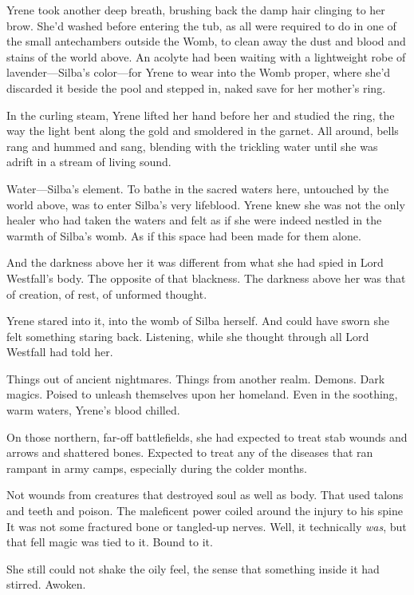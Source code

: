 Yrene took another deep breath, brushing back the damp hair clinging to her brow. She'd washed before entering the tub, as all were required to do in one of the small antechambers outside the Womb, to clean away the dust and blood and stains of the world above. An acolyte had been waiting with a lightweight robe of lavender---Silba's color---for Yrene to wear into the Womb proper, where she'd discarded it beside the pool and stepped in, naked save for her mother's ring.

In the curling steam, Yrene lifted her hand before her and studied the ring, the way the light bent along the gold and smoldered in the garnet. All around, bells rang and hummed and sang, blending with the trickling water until she was adrift in a stream of living sound.

Water---Silba's element. To bathe in the sacred waters here, untouched by the world above, was to enter Silba's very lifeblood. Yrene knew she was not the only healer who had taken the waters and felt as if she were indeed nestled in the warmth of Silba's womb. As if this space had been made for them alone.

And the darkness above her  it was different from what she had spied in Lord Westfall's body. The opposite of that blackness. The darkness above her was that of creation, of rest, of unformed thought.

Yrene stared into it, into the womb of Silba herself. And could have sworn she felt something staring back. Listening, while she thought through all Lord Westfall had told her.

Things out of ancient nightmares. Things from another realm. Demons. Dark magics. Poised to unleash themselves upon her homeland. Even in the soothing, warm waters, Yrene's blood chilled.

On those northern, far-off battlefields, she had expected to treat stab wounds and arrows and shattered bones. Expected to treat any of the diseases that ran rampant in army camps, especially during the colder months.

Not wounds from creatures that destroyed soul as well as body. That used talons and teeth and poison. The maleficent power coiled around the injury to his spine  It was not some fractured bone or tangled-up nerves. Well, it technically \emph{was}, but that fell magic was tied to it. Bound to it.

She still could not shake the oily feel, the sense that something inside it had stirred. Awoken.

